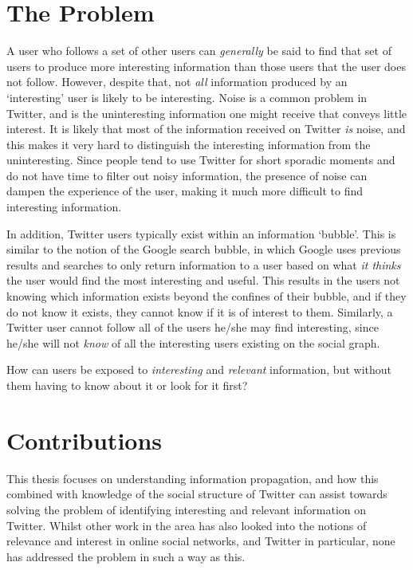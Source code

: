 \section{The Problem}
A user who follows a set of other users can \textit{generally} be said to find that set of users to produce more interesting information than those users that the user does not follow. However, despite that, not \textit{all} information produced by an `interesting' user is likely to be interesting.
Noise is a common problem in Twitter, and is the uninteresting information one might receive that conveys little interest. It is likely that most of the information received on Twitter \textit{is} noise, and this makes it very hard to distinguish the interesting information from the uninteresting.
Since people tend to use Twitter for short sporadic moments and do not have time to filter out noisy information, the presence of noise can dampen the experience of the user, making it much more difficult to find interesting information.

In addition, Twitter users typically exist within an information `bubble'. This is similar to the notion of the Google search bubble, in which Google uses previous results and searches to only return information to a user based on what \textit{it thinks} the user would find the most interesting and useful. This results in the users not knowing which information exists beyond the confines of their bubble, and if they do not know it exists, they cannot know if it is of interest to them. Similarly, a Twitter user cannot follow all of the users he/she may find interesting, since he/she will not \textit{know} of all the interesting users existing on the social graph.

How can users be exposed to \textit{interesting} and \textit{relevant} information, but without them having to know about it or look for it first?


\section{Contributions}
This thesis focuses on understanding information propagation, and how this combined with knowledge of the social structure of Twitter can assist towards solving the problem of identifying interesting and relevant information on Twitter. 
Whilst other work in the area has also looked into the notions of relevance and interest in online social networks, and Twitter in particular, none has addressed the problem in such a way as this.


